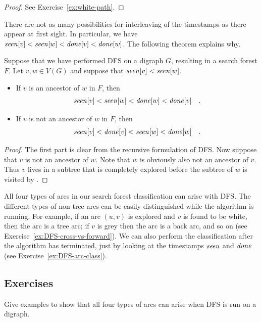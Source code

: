 \begin{proof}
See Exercise~\ref{ex:white-path}.
\end{proof}

There are not as many possibilities for interleaving of the timestamps
as there appear at first sight. In particular, we 
have $\operatorname{\text{\textit{seen}}}[v] < \operatorname{\text{\textit{seen}}}[w] < \operatorname{\text{\textit{done}}}[v] < \operatorname{\text{\textit{done}}}[w]$. The following theorem
explains why.

\begin{Theorem}
\label{thm:DFS-seen-done}
Suppose that we have performed DFS on a digraph $G$, resulting in a 
search forest $F$. Let $v, w \in V(G)$ and suppose that $\operatorname{\text{\textit{seen}}}[v] < \operatorname{\text{\textit{seen}}}[w]$. 

\begin{itemize}
\item
If $v$ is an ancestor of $w$ in $F$, then 
$$\operatorname{\text{\textit{seen}}}[v] < \operatorname{\text{\textit{seen}}}[w] < \operatorname{\text{\textit{done}}}[w] < \operatorname{\text{\textit{done}}}[v] \quad .$$
\item
If $v$ is not an ancestor of $w$ in $F$, then
$$\operatorname{\text{\textit{seen}}}[v] < \operatorname{\text{\textit{done}}}[v]  < \operatorname{\text{\textit{seen}}}[w] < \operatorname{\text{\textit{done}}}[w] \quad .$$
\end{itemize}
\end{Theorem}

\begin{proof} The first part is clear from the recursive formulation
of DFS. Now suppose that $v$ is not an ancestor of $w$. Note that $w$
is obviously also not an ancestor of $v$. 
Thus $v$ lives in a subtree that is completely explored before the 
subtree of $w$ is visited by .
\end{proof}

All four types of arcs in our search forest classification can
arise with DFS. The different types of non-tree arcs can be easily
distinguished while the algorithm is running. For example, if an arc
$(u, v)$ is explored and $v$ is found to be white, then the arc is a
tree arc; if $v$ is grey then the arc is a back arc, and so on (see
Exercise~\ref{ex:DFS-cross-vs-forward}). We can also perform the classification 
after the algorithm has terminated, just by looking at the timestamps 
$\operatorname{\text{\textit{seen}}}$ and $\operatorname{\text{\textit{done}}}$ (see Exercise~\ref{ex:DFS-arc-class}).

\subsection*{Exercises}

\begin{Exercise} 
\label{ex:DFS-all-arcs-occur}
Give examples to show that all four types of arcs can arise when DFS is
run on a digraph.
\end{Exercise}

